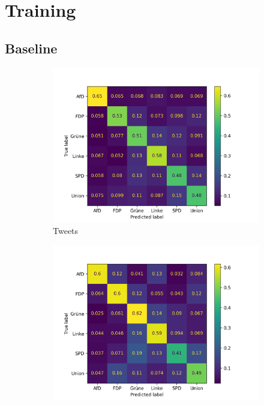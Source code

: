 \section{Training} \label{ch:trainingAppendix}

\subsection*{Baseline}

\begin{figure}[H]
    \centering
    \begin{subfigure}{0.49\textwidth}
        \includegraphics[width=\textwidth]{data/images/modeling/baseline/none/tweets_confusion_matrix.png}
        \caption{Tweets}
        \label{sfig:confusionMatrixBaselineTweetsUnbalanced}
    \end{subfigure}
    \hfill
    \begin{subfigure}{0.49\textwidth}
        \includegraphics[width=\textwidth]{data/images/modeling/baseline/none/party_programs_confusion_matrix.png}

\end{subfigure}
\end{figure}
